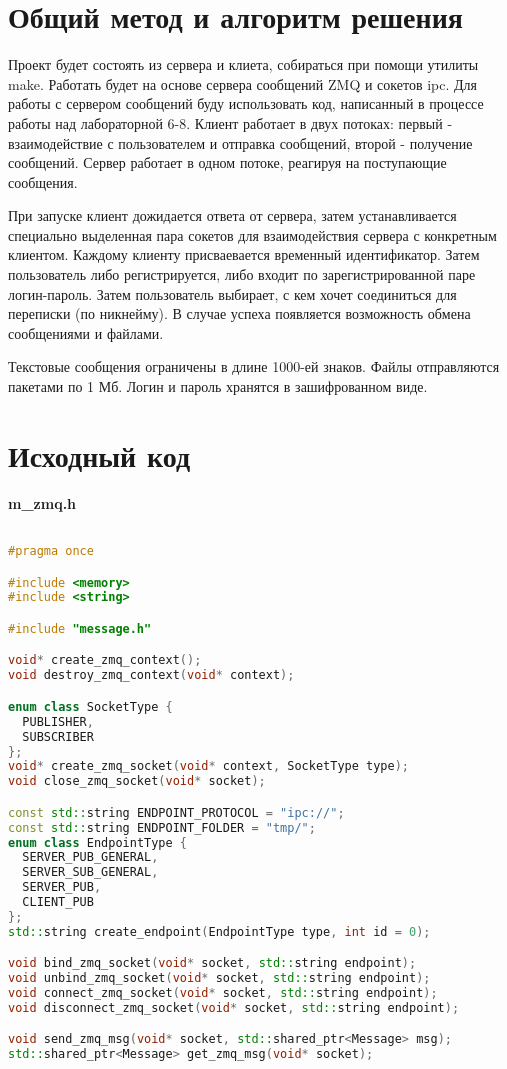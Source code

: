 \section{Общий метод и алгоритм решения}

Проект будет состоять из сервера и клиета, собираться при помощи утилиты make. Работать будет на основе сервера сообщений ZMQ и сокетов ipc. Для работы с сервером сообщений буду использовать код, написанный в процессе работы над лабораторной 6-8. Клиент работает в двух потоках: первый - взаимодействие с пользователем и отправка сообщений, второй - получение сообщений. Сервер работает в одном потоке, реагируя на поступающие сообщения.

При запуске клиент дожидается ответа от сервера, затем устанавливается специально выделенная пара сокетов для взаимодействия сервера с конкретным клиентом. Каждому клиенту присваевается временный идентификатор. Затем пользователь либо регистрируется, либо входит по зарегистрированной паре логин-пароль. Затем пользователь выбирает, с кем хочет соединиться для переписки (по никнейму). В случае успеха появляется возможность обмена сообщениями и файлами.

Текстовые сообщения ограничены в длине 1000-ей знаков. Файлы отправляются пакетами по 1 Мб. Логин и пароль хранятся в зашифрованном виде.

\pagebreak

\section{Исходный код}

\textbf{m\_zmq.h}

\begin{lstlisting}[language=C++]

#pragma once

#include <memory>
#include <string>

#include "message.h"

void* create_zmq_context();
void destroy_zmq_context(void* context);

enum class SocketType {
  PUBLISHER,
  SUBSCRIBER
};
void* create_zmq_socket(void* context, SocketType type);
void close_zmq_socket(void* socket);

const std::string ENDPOINT_PROTOCOL = "ipc://";
const std::string ENDPOINT_FOLDER = "tmp/";
enum class EndpointType {
  SERVER_PUB_GENERAL,
  SERVER_SUB_GENERAL,
  SERVER_PUB,
  CLIENT_PUB
};
std::string create_endpoint(EndpointType type, int id = 0);

void bind_zmq_socket(void* socket, std::string endpoint);
void unbind_zmq_socket(void* socket, std::string endpoint);
void connect_zmq_socket(void* socket, std::string endpoint);
void disconnect_zmq_socket(void* socket, std::string endpoint);

void send_zmq_msg(void* socket, std::shared_ptr<Message> msg);
std::shared_ptr<Message> get_zmq_msg(void* socket);

\end{lstlisting}

